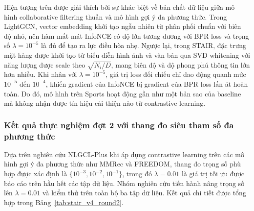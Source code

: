 Hiện tượng trên được giải thích bởi sự khác biệt về bản chất dữ liệu giữa mô hình collaborative filtering thuần và mô hình gợi ý đa phương thức. Trong LightGCN, vector embedding khởi tạo ngẫu nhiên từ phân phối chuẩn với biên độ nhỏ, nên hàm mất mát InfoNCE có độ lớn tương đương với BPR loss và trọng số $\lambda = 10^{-5}$ là đủ để tạo ra lực điều hòa nhẹ. Ngược lại, trong STAIR, đặc trưng mặt hàng được khởi tạo từ biểu diễn hình ảnh và văn bản qua SVD whitening với năng lượng được scale theo $\sqrt{N_i/D}$, mang biên độ và độ phong phú thông tin lớn hơn nhiều. Khi nhân với $\lambda = 10^{-5}$, giá trị loss đối chiếu chỉ dao động quanh mức $10^{-5}$ đến $10^{-4}$, khiến gradient của InfoNCE bị gradient của BPR loss lấn át hoàn toàn. Do đó, mô hình trên Sports hoạt động gần như một bản sao của baseline mà không nhận được tín hiệu cải thiện nào từ contrastive learning.

\subsubsection{Kết quả thực nghiệm đợt 2 với thang đo siêu tham số đa phương thức}

Dựa trên nghiên cứu NLGCL-Plus khi áp dụng contrastive learning trên các mô hình gợi ý đa phương thức như MMRec và FREEDOM, thang đo trọng số phù hợp được xác định là $\{10^{-3}, 10^{-2}, 10^{-1}\}$, trong đó $\lambda = 0.01$ là giá trị tối ưu được báo cáo trên hầu hết các tập dữ liệu. Nhóm nghiên cứu tiến hành nâng trọng số lên $\lambda = 0.01$ và kiểm thử trên toàn bộ ba tập dữ liệu. Kết quả chi tiết được tổng hợp trong Bảng~\ref{tab:stair_v4_round2}.

